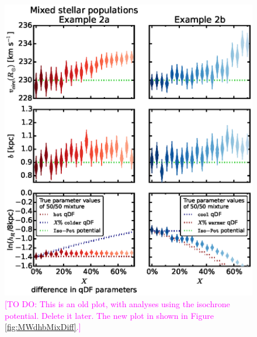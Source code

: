 \documentclass[iop,revtex4,numberedappendix,appendixfloats]{emulateapj}
\newcommand{\Wilma}[1]{\textcolor{Magenta}{#1}}
\begin{document}
\begin{figure}[!htbp]
\begin{minipage}{0.48\textwidth}
\label{fig:IsoSphFlexMixCont}
\end{minipage}
\hfill
\begin{minipage}{0.48\textwidth}
\centering
\includegraphics[scale=0.55]{figs/isoSphFlexMixDiff_violins_2.eps}
\caption{\Wilma{[TO DO: This is an old plot, with analyses using the isochrone potential. Delete it later.  The new plot in shown in Figure \ref{fig:MWdhbMixDiff}.]}}
\label{fig:IsoSphFlexMixDiff}
\end{minipage}
\end{figure}
\end{document}
